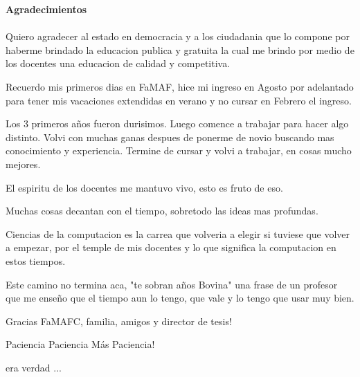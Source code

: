 {\huge \textbf{Agradecimientos}}
\\
\\
Quiero agradecer al estado en democracia y a los ciudadania que lo compone por haberme
brindado la educacion publica y gratuita la cual me brindo por medio de los docentes 
una educacion de calidad y competitiva.

Recuerdo mis primeros dias en FaMAF, hice mi ingreso en Agosto por adelantado
para tener mis vacaciones extendidas en verano y no cursar en Febrero el ingreso.

Los 3 primeros años fueron durisimos. Luego comence a trabajar para hacer algo distinto.
Volvi con muchas ganas despues de ponerme de novio buscando mas conocimiento y experiencia.
Termine de cursar y volvi a trabajar, en cosas mucho mejores.

El espiritu de los docentes me mantuvo vivo, esto es fruto de eso.

Muchas cosas decantan con el tiempo, sobretodo las ideas mas profundas.

Ciencias de la computacion es la carrea que volveria a elegir si tuviese que volver 
a empezar, por el temple de mis docentes y lo que significa la computacion en estos tiempos.

Este camino no termina aca, "te sobran años Bovina" una frase de un profesor que me enseño
que el tiempo aun lo tengo, que vale y lo tengo que usar muy bien.

Gracias FaMAFC, familia, amigos y director de tesis!

Paciencia
Paciencia
Más Paciencia!

era verdad ...
\newpage
